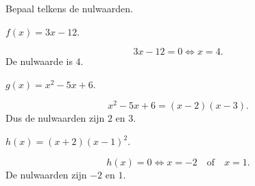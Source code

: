 \documentclass{ximera}
\begin{document}
\begin{oefening}{\oefB\ESS}

Bepaal telkens de nulwaarden.

\begin{question}
\(
f(x)=3x-12.
\)

\begin{oplossing}
\[
3x-12=0
\Longleftrightarrow x=4.
\]
De nulwaarde is \(4\).
\end{oplossing}
\end{question}

\begin{question}
\(
g(x)=x^2-5x+6.
\)

\begin{oplossing}
\[
x^2-5x+6=(x-2)(x-3).
\]
Dus de nulwaarden zijn \(2\) en \(3\).
\end{oplossing}
\end{question}

\begin{question}
\(
h(x)=(x+2)(x-1)^2.
\)

\begin{oplossing}
\[
h(x)=0
\Longleftrightarrow
x=-2\quad\text{of}\quad x=1.
\]
De nulwaarden zijn \(-2\) en \(1\).
\end{oplossing}
\end{question}

\end{oefening}
\end{document}
